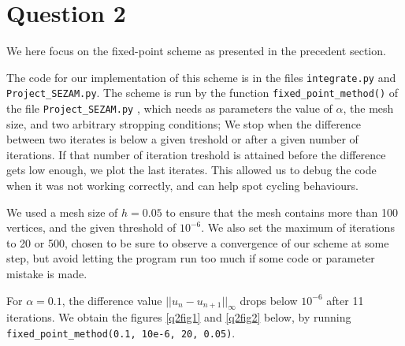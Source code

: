 \documentclass[11pt, a4paper, twoside]{article}
\begin{document}
\section*{Question 2}
We here focus on the fixed-point scheme as presented in the precedent section.

The code for our implementation of this scheme is in the files \verb+integrate.py+ and \verb+Project_SEZAM.py+. The scheme is run by the function \verb+fixed_point_method()+ of the file  \verb+Project_SEZAM.py+ , which needs as parameters the value of $\alpha$, the mesh size, and two arbitrary stropping conditions; We stop when the difference between two iterates is below a given treshold or after a given number of iterations. If that number of iteration treshold is attained before the difference gets low enough, we plot the last iterates. This allowed us to debug the code when it was not working correctly, and can help spot cycling behaviours.

We used a mesh size of $h=0.05$ to ensure that the mesh contains more than 100 vertices, and the given threshold of $10^{-6}$. We also set the maximum of iterations to 20 or 500, chosen to be sure to observe a convergence of our scheme at some step, but avoid letting the program run too much if some code or parameter mistake is made.

For $\alpha=0.1$, the difference value $||u_n -u_{n+1}||_\infty$ drops below $10^{-6}$ after 11 iterations. We obtain the figures \ref{q2fig1}  and \ref{q2fig2} below, by running \verb+fixed_point_method(0.1, 10e-6, 20, 0.05)+.
\end{document}
